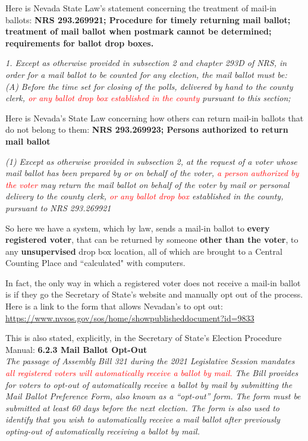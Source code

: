 Here is Nevada State Law's statement concerning the treatment of mail-in ballots:
\textbf{NRS 293.269921; Procedure for timely returning mail ballot; treatment of mail ballot when postmark cannot be determined; requirements for ballot drop boxes.}

\textit{1. Except as otherwise provided in subsection 2 and chapter 293D of NRS, in order for a mail ballot to be counted for any election, the mail ballot must be:}\\
\textit{(A) Before the time set for closing of the polls, delivered by hand to the county clerk, \textcolor{red}{or any ballot drop box established in the county} pursuant to this section;}

Here is Nevada's State Law concerning how others can return mail-in ballots that do not belong to them: \textbf{NRS 293.269923; Persons authorized to return mail ballot}

\textit{(1) Except as otherwise provided in subsection 2, at the request of a voter whose mail ballot has been prepared by or on behalf of the voter, \textcolor{red}{a person authorized by the voter} may return the mail ballot on behalf of the voter by mail or personal delivery to the county clerk, \textcolor{red}{or any ballot drop box} established in the county, pursuant to NRS 293.269921}

So here we have a system, which by law, sends a mail-in ballot to \textbf{every registered voter}, that can be returned by someone \textbf{other than the voter}, to any \textbf{unsupervised} drop box location, all of which are brought to a Central Counting Place and ``calculated" with computers.

In fact, the only way in which a registered voter does not receive a mail-in ballot is if they go the Secretary of State's website and manually opt out of the process. Here is a link to the form that allows Nevadan's to opt out: \url{https://www.nvsos.gov/sos/home/showpublisheddocument?id=9833}

This is also stated, explicitly, in the Secretary of State's Election Procedure Manual: \textbf{6.2.3 Mail Ballot Opt-Out}\\
\textit{The passage of Assembly Bill 321 during the 2021 Legislative Session mandates \textcolor{red}{all registered voters will
automatically receive a ballot by mail.} The Bill provides for voters to opt-out of automatically receive a ballot
by mail by submitting the Mail Ballot Preference Form, also known as a “opt-out” form. The form must be
submitted at least 60 days before the next election. The form is also used to identify that you wish to
automatically receive a mail ballot after previously opting-out of automatically receiving a ballot by mail.}

